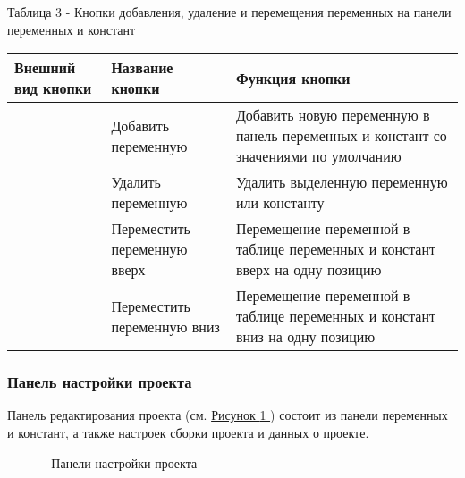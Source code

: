 \documentclass[letterpaper,10pt,russian]{sphinxmanual}
\begin{document}
Таблица 3 - Кнопки добавления, удаление и перемещения переменных на
панели переменных и констант

\noindent\begin{tabulary}{\linewidth}{|L|L|L|}
\hline
\textsf{\relax 
Внешний вид кнопки
\unskip}\relax &\textsf{\relax 
Название кнопки
\unskip}\relax &\textsf{\relax 
Функция кнопки
\unskip}\relax \\
\hline
{}
&
Добавить переменную
&
Добавить новую
переменную в панель
переменных и констант
со значениями по
умолчанию
\\
\hline
{}
&
Удалить переменную
&
Удалить выделенную
переменную или
константу
\\
\hline
{}
&
Переместить
переменную вверх
&
Перемещение
переменной в таблице
переменных и констант
вверх на одну позицию
\\
\hline
{}
&
Переместить
переменную вниз
&
Перемещение
переменной в таблице
переменных и констант
вниз на одну позицию
\\
\hline\end{tabulary}



\subsubsection{Панель настройки проекта}
\label{usage_guide/ide_components:id5}
Панель редактирования проекта (см. \hyperref[usage_guide/ide_components:image40]{Рисунок \ref{usage_guide/ide_components:image40} }) состоит из панели переменных
и констант, а также настроек сборки проекта и данных о проекте.
\begin{figure}[htbp]
\centering
\capstart

\noindent{}
\caption{- Панели настройки проекта}\label{usage_guide/ide_components:image40}\end{figure}
\end{document}
